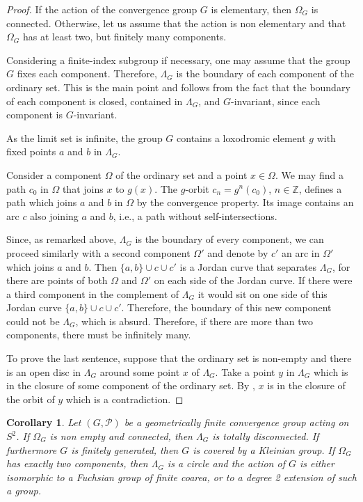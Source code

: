 \documentclass[11pt]{article}
\newtheorem{corollary}[theorem]{Corollary}
\theoremstyle{definition}
\newcommand\PP{\mathcal{P}}
\newcommand\Z{\mathbb{Z}}
\begin{document}
\begin{proof}
If the action of the convergence group $G$ is elementary, then $\Omega_G$ is connected. Otherwise, let us assume that the action is non elementary and that $\Omega_G$ has at least two, but finitely many
components.

Considering a finite-index subgroup if necessary, one may assume that the group $G$ fixes each component. Therefore, $\Lambda_G$ is the 
boundary of each component of the ordinary set. This is the main point and follows from the fact that the boundary of each component is closed, contained in $\Lambda_G$, and $G$-invariant, since each component is $G$-invariant.

{As the limit set is infinite,} the group $G$ contains a loxodromic element $g$ with fixed points $a$ and $b$ in $\Lambda_G$. 

Consider a component $\Omega$ of the ordinary set and a point $x\in \Omega$. We may find a path $c_0$  in $\Omega$ that joins $x$ to $g(x)$. The $g$-orbit 
$c_n=g^n(c_0)$, $n\in\Z$, defines a path which joins $a$ and $b$ in $\Omega$ by the convergence property. Its image contains an arc $c$ also  joining $a$ and $b$, i.e., a path without self-intersections.

Since, as remarked above, $\Lambda_G$ is the boundary of every component, we can proceed similarly with a second
component $\Omega'$ and denote by $c'$ an arc in $\Omega'$ which joins $a$ and $b$. Then $\{a,b\}\cup c \cup c'$ is a Jordan curve that separates $\Lambda_G$, for there are points of both $\Omega$ and $\Omega'$ on each side of the Jordan curve.
If there were a third component in the complement of $\Lambda_G$ it would sit on one side of this Jordan curve $\{a,b\}\cup c \cup c'$. Therefore, the boundary of this new component could not be $\Lambda_G$, which is absurd. 
Therefore, if there are more than two components, there must be infinitely many. 

To prove the last sentence, suppose that the ordinary set is non-empty and there is an open disc in $\Lambda_G$ around some point $x$ of $\Lambda_G $.  Take a point $y$ in $\Lambda_G$ which is in the closure of some component of the ordinary set.  By \cite[Theorem 2S]{tukia:convergence_groups}, $x$ is in the closure of the orbit of $y$ which is a contradiction. 
\end{proof} 

\begin{corollary} \label{cor:1or2} Let $(G,\PP)$ be a geometrically finite convergence group acting on $S^2$. If $\Omega_G$ is non empty and connected, then $\Lambda_G $ is totally disconnected. If furthermore $G$ is finitely generated, then $G$ is covered by a Kleinian group.  If $\Omega_G$ has exactly
two components, then $\Lambda_G$ is a circle and the action of $G$ is either isomorphic to a Fuchsian group of finite coarea, or to a degree 2 extension of such a group. \end{corollary}
\end{document}
